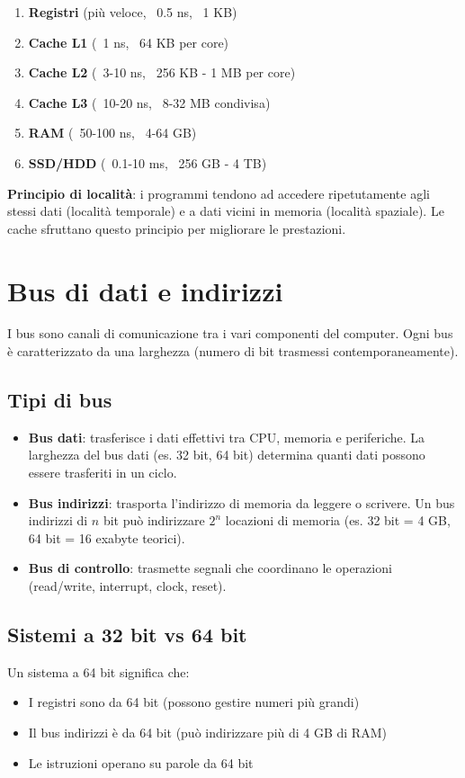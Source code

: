 \documentclass[12pt,a4paper]{article}
\begin{document}
\begin{enumerate}
    \item \textbf{Registri} (più veloce, ~0.5 ns, ~1 KB)
    \item \textbf{Cache L1} (~1 ns, ~64 KB per core)
    \item \textbf{Cache L2} (~3-10 ns, ~256 KB - 1 MB per core)
    \item \textbf{Cache L3} (~10-20 ns, ~8-32 MB condivisa)
    \item \textbf{RAM} (~50-100 ns, ~4-64 GB)
    \item \textbf{SSD/HDD} (~0.1-10 ms, ~256 GB - 4 TB)
\end{enumerate}

\textbf{Principio di località}: i programmi tendono ad accedere ripetutamente agli stessi dati (località temporale) e a dati vicini in memoria (località spaziale). Le cache sfruttano questo principio per migliorare le prestazioni.

\section{Bus di dati e indirizzi}
I bus sono canali di comunicazione tra i vari componenti del computer. Ogni bus è caratterizzato da una larghezza (numero di bit trasmessi contemporaneamente).

\subsection{Tipi di bus}
\begin{itemize}
    \item \textbf{Bus dati}: trasferisce i dati effettivi tra CPU, memoria e periferiche. La larghezza del bus dati (es. 32 bit, 64 bit) determina quanti dati possono essere trasferiti in un ciclo.
    \item \textbf{Bus indirizzi}: trasporta l'indirizzo di memoria da leggere o scrivere. Un bus indirizzi di $n$ bit può indirizzare $2^n$ locazioni di memoria (es. 32 bit = 4 GB, 64 bit = 16 exabyte teorici).
    \item \textbf{Bus di controllo}: trasmette segnali che coordinano le operazioni (read/write, interrupt, clock, reset).
\end{itemize}

\subsection{Sistemi a 32 bit vs 64 bit}
Un sistema a 64 bit significa che:
\begin{itemize}
    \item I registri sono da 64 bit (possono gestire numeri più grandi)
    \item Il bus indirizzi è da 64 bit (può indirizzare più di 4 GB di RAM)
    \item Le istruzioni operano su parole da 64 bit
\end{itemize}
\end{document}

